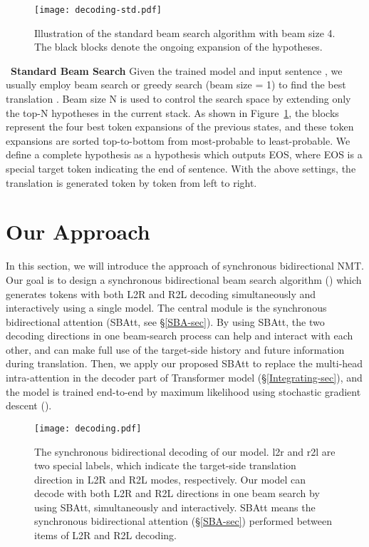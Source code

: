\documentclass[11pt,a4paper]{article}
\begin{document}
\begin{CJK*}{UTF8}{gbsn}
\begin{figure}
	\centering
	\texttt{[image: decoding-std.pdf]}
	\caption{Illustration of the standard beam search algorithm with beam size 4. The black blocks denote the ongoing expansion of the hypotheses.
	}\label{decoding-std}
\end{figure}

~\textbf{Standard Beam Search}
Given the trained model and input sentence , we usually employ beam search or greedy search (beam size = 1) to find the best translation .
Beam size N is used to control the search space by extending only the top-N hypotheses in the current stack.
As shown in Figure~\ref{decoding-std}, the blocks represent the four best token expansions of the previous states, and these token expansions are sorted top-to-bottom from most-probable to least-probable.
We define a complete hypothesis as a hypothesis which outputs EOS, where EOS is a special target token indicating the end of sentence.
With the above settings, the translation  is generated token by token from left to right.


\section{Our Approach}

In this section, we will introduce the approach of synchronous bidirectional NMT. Our goal is to design a synchronous bidirectional beam search algorithm  () which generates tokens with both L2R and R2L decoding simultaneously and interactively using a single model.
The central module is the synchronous bidirectional attention (SBAtt, see \S\ref{SBA-sec}). By using SBAtt, the two decoding directions in one beam-search process can help and interact with each other, and can make full use of the target-side history and future information during translation.
Then, we apply our proposed SBAtt to replace the multi-head intra-attention in the decoder part of Transformer model (\S\ref{Integrating-sec}),
and the model is trained end-to-end by maximum likelihood using stochastic gradient descent ().

\begin{figure}
	\centering
	\texttt{[image: decoding.pdf]}
	\caption{The synchronous bidirectional decoding of our model. {l2r} and {r2l} are two special labels, which indicate the target-side translation direction in L2R and R2L modes, respectively.
	Our model can decode with both L2R and R2L directions in one beam search by using SBAtt, simultaneously and interactively.
	SBAtt means the synchronous bidirectional attention (\S\ref{SBA-sec}) performed between items of L2R and R2L decoding.
	}\label{decoding}
\end{figure}


\end{CJK*}
\end{document}
